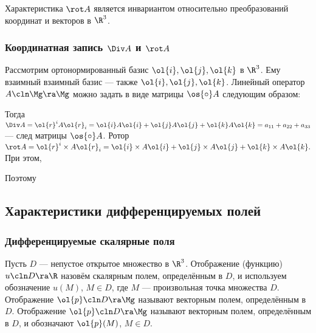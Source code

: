 \documentclass[a4paper]{article}
\begin{document}
Характеристика $\rot A$ является инвариантом относительно
преобразований координат и векторов в $\R^3$.

\subsubsection{Координатная запись $\Div A$ и $\rot A$}

Рассмотрим ортонормированный базис $\ol{i},\ol{j},\ol{k}$ в $\R^3$.
Ему взаимный взаимный базис --- также $\ol{i},\ol{j},\ol{k}$.
Линейный оператор $A\cln\Mg\ra\Mg$ можно задать в виде матрицы
$\os{\circ}A$ следующим образом:


Тогда $\Div A = \ol{r}^i A \ol{r}_i = \ol{i}A\ol{i} + \ol{j}A\ol{j}
+ \ol{k} A \ol{k} = a_{11}+a_{22} + a_{33}$ --- след матрицы
$\os{\circ}A$. Ротор $\rot A=\ol{r}^i\times A\ol{r}_i=\ol{i} \times
A \ol{i} + \ol{j}\times A\ol{j} + \ol{k}\times A\ol{k}.$ При этом,

 

Поэтому 

\subsection{Характеристики дифференцируемых полей}
\subsubsection{Дифференцируемые скалярные поля}

Пусть $D$ --- непустое открытое множество в $\R^3$. Отображение
(функцию) $u\cln D\ra\R$ назовём скалярным полем, определённым в
$D$, и используем обозначение $u(M)$, $M\in D$, где $M$ ---
произвольная точка множества $D$. Отображение $\ol{p}\cln D\ra\Mg$
называют векторным полем, определённым в $D$. Отображение
$\ol{p}\cln D\ra\Mg$ называют векторным полем, определённым в $D$, и
обозначают $\ol{p}(M)$, $M\in D$.
\end{document}
